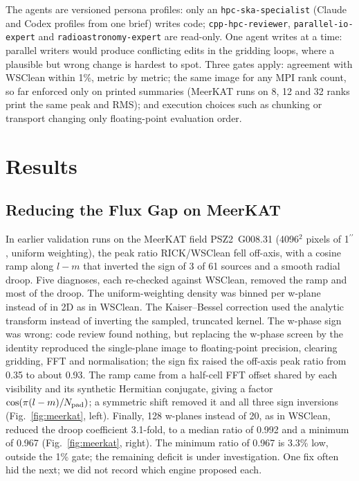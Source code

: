 \documentclass[11pt,twoside]{article}
\begin{document}
The agents are versioned persona profiles: only an
\texttt{hpc-ska-specialist} (Claude and Codex profiles from one brief) writes
code; \texttt{cpp-hpc-reviewer}, \texttt{parallel-io-expert} and
\texttt{radioastronomy-expert} are read-only. One agent writes at a time:
parallel writers would produce conflicting edits in the gridding loops, where
a plausible but wrong change is hardest to spot. Three gates apply: agreement
with WSClean within 1\%, metric by metric; the same image for any MPI rank
count, so far enforced only on printed summaries (MeerKAT runs on 8, 12 and 32
ranks print the same peak and RMS); and execution choices such as chunking or
transport changing only floating-point evaluation order.

\section{Results}

\subsection{Reducing the Flux Gap on MeerKAT}

In earlier validation runs on the MeerKAT field PSZ2~G008.31 (4096$^2$ pixels
of 1$^{\prime\prime}$, uniform weighting), the peak ratio RICK/WSClean fell
off-axis, with a cosine ramp along $l-m$ that inverted the sign of 3 of 61
sources and a smooth radial droop. Five diagnoses, each re-checked against
WSClean, removed the ramp and most of the droop. The uniform-weighting density was binned per w-plane
instead of in 2D as in WSClean. The Kaiser--Bessel correction used the
analytic transform instead of inverting the sampled, truncated kernel. The
w-phase sign was wrong: code review found nothing, but replacing the w-phase
screen by the identity reproduced the single-plane image to floating-point
precision, clearing gridding, FFT and normalisation; the sign fix raised the
off-axis peak ratio from 0.35 to about 0.93. The ramp came from a half-cell
FFT offset shared by each visibility and its synthetic Hermitian conjugate,
giving a factor $\cos(\pi (l-m)/N_{\rm pad})$; a symmetric shift removed it
and all three sign inversions (Fig.~\ref{fig:meerkat}, left). Finally, 128
w-planes instead of 20, as in WSClean, reduced the droop coefficient 3.1-fold,
to a median ratio of 0.992 and a minimum of 0.967 (Fig.~\ref{fig:meerkat},
right). The minimum ratio of 0.967 is 3.3\% low, outside the 1\% gate; the
remaining deficit is under investigation. One fix often hid the next; we did
not record which engine proposed each.
\end{document}
